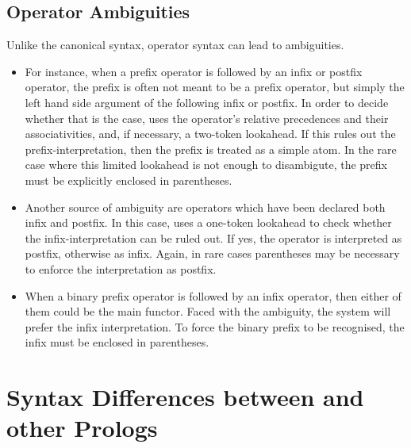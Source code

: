 \subsection{Operator Ambiguities}
Unlike the canonical syntax, operator syntax can lead to ambiguities.
\begin{itemize}
\item
{}
For instance, when a prefix operator is followed by an infix or postfix
operator, the prefix is often not meant to be a prefix operator, but
simply the left hand side argument of the following infix or postfix.
In order to decide whether that is the case, {\eclipse} uses the operator's
relative precedences and their associativities, and, if necessary,
a two-token lookahead. If this rules out the prefix-interpretation, then
the prefix is treated as a simple atom. In the rare case where this
limited lookahead is not enough to disambigute, the prefix must be
explicitly enclosed in parentheses.

\item
{}
Another source of ambiguity are operators which have been declared
both infix and postfix. In this case, {\eclipse} uses a one-token
lookahead to check whether the infix-interpretation can be ruled out.
If yes, the operator is interpreted as postfix, otherwise as infix.
Again, in rare cases parentheses may be necessary to enforce the
interpretation as postfix.

\item
{}
When a binary prefix operator is followed by an infix operator, then
either of them could be the main functor. Faced with the ambiguity, the
system will prefer the infix interpretation. To force the binary prefix
to be recognised, the infix must be enclosed in parentheses.
\end{itemize}



\section{Syntax Differences between {\eclipse} and other Prologs}
\label{syntaxdiff}

